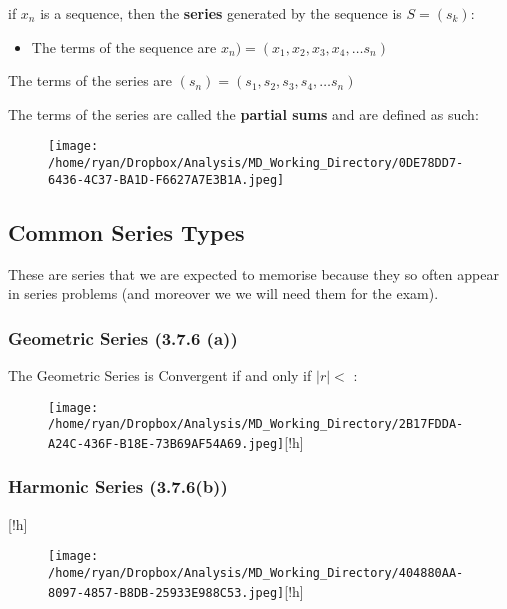 \documentclass[
]{article}
\begin{document}
if \(x_n\) is a sequence, then the \textbf{series} generated by the
sequence is \(S = (s_k)\):

\begin{itemize}
\item
  The terms of the sequence are
  \(x_n) = (x_1, x_2, x_3, x_4, \dots s_n)\)
\end{itemize}

The terms of the series are \((s_n) = (s_1, s_2, s_3, s_4, \dots s_n)\)

The terms of the series are called the \textbf{partial sums} and are
defined as such:

\begin{figure}
\centering
\texttt{[image: /home/ryan/Dropbox/Analysis/MD\_Working\_Directory/0DE78DD7-6436-4C37-BA1D-F6627A7E3B1A.jpeg]}
\caption{}
\end{figure}

\hypertarget{header-n3150}{%
\subsection{Common Series Types}\label{header-n3150}}

These are series that we are expected to memorise because they so often
appear in series problems (and moreover we we will need them for the
exam).

\hypertarget{header-n3152}{%
\subsubsection{Geometric Series (3.7.6 (a))}\label{header-n3152}}

The Geometric Series is Convergent if and only if \(\mid r \mid < \) :

\begin{figure}
\centering
\texttt{[image: /home/ryan/Dropbox/Analysis/MD\_Working\_Directory/2B17FDDA-A24C-436F-B18E-73B69AF54A69.jpeg]}[!h]
\caption{}
\end{figure}

\newpage
\hypertarget{header-n3155}{%
\subsubsection{Harmonic Series (3.7.6(b))}\label{header-n3155}}[!h]

\begin{figure}
\centering
\texttt{[image: /home/ryan/Dropbox/Analysis/MD\_Working\_Directory/404880AA-8097-4857-B8DB-25933E988C53.jpeg]}[!h]
\caption{}
\end{figure}
\end{document}
